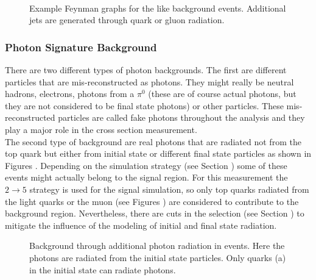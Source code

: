 \begin{figure}[ht]
 \\
  \caption{Example Feynman graphs for the \ttbar like background events. Additional jets are generated through quark or gluon radiation.\cite{steeger}}
  \label{fig_ttg_bkg}
\end{figure}

\subsubsection{Photon Signature Background}


There are two different types of photon backgrounds. The first are different particles that are mis-reconstructed as photons. They might really be neutral hadrons, electrons, photons from a $\pi^0$ (these are of course actual photons, but they are not considered to be final state photons) or other particles. These mis-reconstructed particles are called fake photons throughout the analysis and they play a major role in the cross section measurement. \\
The second type of background are real photons that are radiated not from the top quark but either from initial state or different final state particles as shown in Figures . Depending on the simulation strategy (see Section ) some of these events might actually belong to the signal region. For this measurement the $2 \to 5$ strategy is used for the signal simulation, so only top quarks radiated from the light quarks or the muon (see Figures ) are considered to contribute to the background region. Nevertheless, there are cuts in the selection (see Section ) to mitigate the influence of the modeling of initial and final state radiation.

\begin{figure}[ht]
  \caption{Background through additional photon radiation in \ttbar events. Here the photons are radiated from the initial state particles. Only quarks (a) in the initial state can radiate photons. \cite{Hermanns:1292768}}
  \label{fig_ttg_bkg_isr}
\end{figure}

